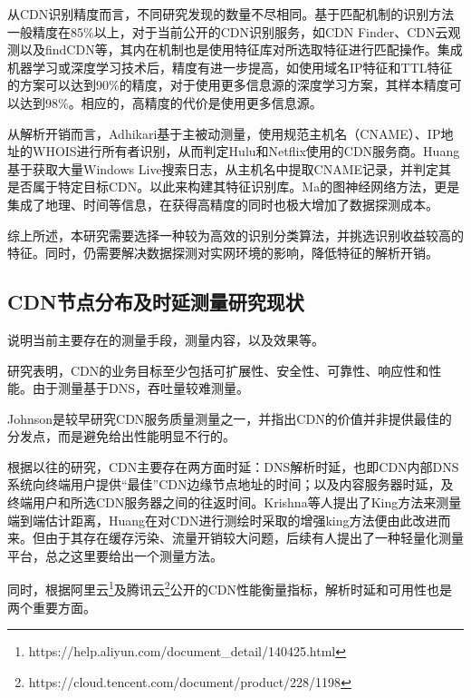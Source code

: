 从CDN识别精度而言，不同研究发现的数量不尽相同。基于匹配机制的识别方法一般精度在85\%以上，对于当前公开的CDN识别服务，如CDN Finder、CDN云观测以及findCDN等，其内在机制也是使用特征库对所选取特征进行匹配操作。集成机器学习或深度学习技术后，精度有进一步提高，如使用域名IP特征和TTL特征的方案可以达到90\%的精度，对于使用更多信息源的深度学习方案\cite{Ma2021}，其样本精度可以达到98\%。相应的，高精度的代价是使用更多信息源。

从解析开销而言，Adhikari\cite{Adhikari2014}基于主被动测量，使用规范主机名（CNAME）、IP地址的WHOIS进行所有者识别，从而判定Hulu和Netflix使用的CDN服务商。Huang\cite{Huang2008}基于获取大量Windows Live搜索日志，从主机名中提取CNAME记录，并判定其是否属于特定目标CDN。以此来构建其特征识别库。Ma\cite{Ma2021}的图神经网络方法，更是集成了地理、时间等信息，在获得高精度的同时也极大增加了数据探测成本。 

综上所述，本研究需要选择一种较为高效的识别分类算法，并挑选识别收益较高的特征。同时，仍需要解决数据探测对实网环境的影响，降低特征的解析开销。



\subsection{CDN节点分布及时延测量研究现状}



说明当前主要存在的测量手段，测量内容，以及效果等。
 

研究\cite{Pathan-survey-2007}表明，CDN的业务目标至少包括可扩展性、安全性、可靠性、响应性和性能。由于测量基于DNS，吞吐量较难测量\cite{Huang2008}。



Johnson是较早研究CDN服务质量测量\cite{Johnson-2001-cdn-measure}之一，并指出CDN的价值并非提供最佳的分发点，而是避免给出性能明显不行的。

根据以往的研究\cite{Huang2008}，CDN主要存在两方面时延：DNS解析时延，也即CDN内部DNS系统向终端用户提供“最佳”CDN边缘节点地址的时间；以及内容服务器时延，及终端用户和所选CDN服务器之间的往返时间。Krishna等人提出了King\cite{King-2002}方法来测量端到端估计距离，Huang\cite{Huang2008}在对CDN进行测绘时采取的增强king方法便由此改进而来。但由于其存在缓存污染、流量开销较大问题，后续有人提出了一种轻量化测量平台\cite{Zhang-2021-Scale-platform}，总之这里要给出一个测量方法。

同时，根据阿里云\footnote{https://help.aliyun.com/document\_detail/140425.html}及腾讯云\footnote{https://cloud.tencent.com/document/product/228/1198}公开的CDN性能衡量指标，解析时延和可用性也是两个重要方面。

